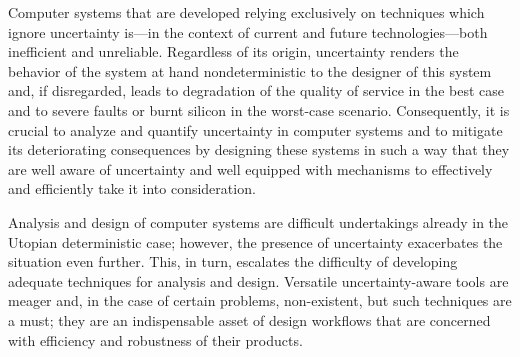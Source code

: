 Computer systems that are developed relying exclusively on techniques which
ignore uncertainty is---in the context of current and future technologies---both
inefficient and unreliable. Regardless of its origin, uncertainty renders the
behavior of the system at hand nondeterministic to the designer of this system
and, if disregarded, leads to degradation of the quality of service in the best
case and to severe faults or burnt silicon in the worst-case scenario.
Consequently, it is crucial to analyze and quantify uncertainty in computer
systems and to mitigate its deteriorating consequences by designing these
systems in such a way that they are well aware of uncertainty and well equipped
with mechanisms to effectively and efficiently take it into consideration.

Analysis and design of computer systems are difficult undertakings already in
the Utopian deterministic case; however, the presence of uncertainty exacerbates
the situation even further. This, in turn, escalates the difficulty of
developing adequate techniques for analysis and design. Versatile
uncertainty-aware tools are meager and, in the case of certain problems,
non-existent, but such techniques are a must; they are an indispensable asset of
design workflows that are concerned with efficiency and robustness of their
products.
